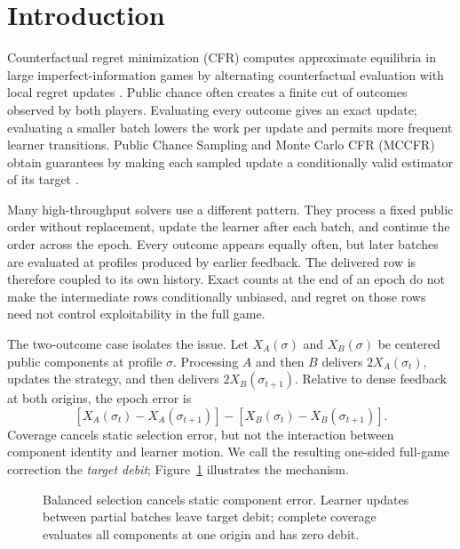 \section{Introduction}
\label{sec:introduction}

Counterfactual regret minimization (CFR) computes approximate equilibria in
large imperfect-information games by alternating counterfactual evaluation
with local regret updates \citep{zinkevich2007cfr}.  Public chance often
creates a finite cut of outcomes observed by both players.  Evaluating every
outcome gives an exact update; evaluating a smaller batch lowers the work per
update and permits more frequent learner transitions.  Public Chance Sampling
and Monte Carlo CFR (MCCFR) obtain guarantees by making each sampled update a
conditionally valid estimator of its target
\citep{lanctot2009mccfr,johanson2012pcs,farina2020stochastic}.

Many high-throughput solvers use a different pattern.  They process a fixed
public order without replacement, update the learner after each batch, and
continue the order across the epoch.  Every outcome appears equally often,
but later batches are evaluated at profiles produced by earlier feedback.
The delivered row is therefore coupled to its own history.  Exact counts at
the end of an epoch do not make the intermediate rows conditionally unbiased,
and regret on those rows need not control exploitability in the full game.

The two-outcome case isolates the issue.  Let $X_A(\sigma)$ and
$X_B(\sigma)$ be centered public components at profile $\sigma$.  Processing
$A$ and then $B$ delivers $2X_A(\sigma_t)$, updates the strategy, and then
delivers $2X_B(\sigma_{t+1})$.  Relative to dense feedback at both origins,
the epoch error is
\[
 [X_A(\sigma_t)-X_A(\sigma_{t+1})]
 -[X_B(\sigma_t)-X_B(\sigma_{t+1})].
\]
Coverage cancels static selection error, but not the interaction between
component identity and learner motion.  We call the resulting one-sided
full-game correction the \emph{target debit};
Figure~\ref{fig:two-outcome-mechanism} illustrates the mechanism.

\begin{figure}[t]
\centering

\caption{Balanced selection cancels static component error.  Learner updates
between partial batches leave target debit; complete coverage evaluates all
components at one origin and has zero debit.}
\label{fig:two-outcome-mechanism}
\end{figure}


